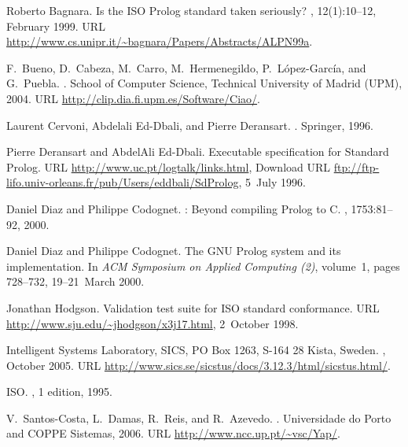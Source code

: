 \documentclass[draft]{llncs}%
\begin{document}
\begin{thebibliography}{10}

Roberto Bagnara.
\newblock Is the {ISO Prolog} standard taken seriously?
, 12(1):10--12,
  February 1999.
\newblock URL \url{http://www.cs.unipr.it/~bagnara/Papers/Abstracts/ALPN99a}.

F.~Bueno, D.~Cabeza, M.~Carro, M.~Hermenegildo, P.~L{\'o}pez-Garc{\'i}a, and
  G.~Puebla.
.
\newblock School of Computer Science, Technical University of Madrid (UPM),
  2004.
\newblock URL \url{http://clip.dia.fi.upm.es/Software/Ciao/}.

Laurent Cervoni, Abdelali Ed-Dbali, and Pierre Deransart.
.
\newblock Springer, 1996.

Pierre Deransart and AbdelAli Ed-Dbali.
\newblock Executable specification for {Standard Prolog}.
\newblock URL \url{http://www.uc.pt/logtalk/links.html}, Download URL
  \url{ftp://ftp-lifo.univ-orleans.fr/pub/Users/eddbali/SdProlog}, 5~July 1996.

Daniel Diaz and Philippe Codognet.
: Beyond compiling {Prolog} to {C}.
, 1753:81--92, 2000.

Daniel Diaz and Philippe Codognet.
\newblock The {GNU Prolog} system and its implementation.
\newblock In {\em ACM Symposium on Applied Computing (2)}, volume~1, pages
  728--732, 19--21~March 2000.

Jonathan Hodgson.
\newblock Validation test suite for {ISO} standard conformance.
\newblock URL \url{http://www.sju.edu/~jhodgson/x3j17.html}, 2~October 1998.

Intelligent Systems Laboratory, SICS, PO Box 1263, S-164 28 Kista, Sweden.
, October
  2005.
\newblock URL \url{http://www.sics.se/sicstus/docs/3.12.3/html/sicstus.html/}.

ISO.
, 1
  edition, 1995.

V.~Santos-Costa, L.~Damas, R.~Reis, and R.~Azevedo.
.
\newblock Universidade do Porto and COPPE Sistemas, 2006.
\newblock URL \url{http://www.ncc.up.pt/~vsc/Yap/}.


\end{thebibliography}
\end{document}
